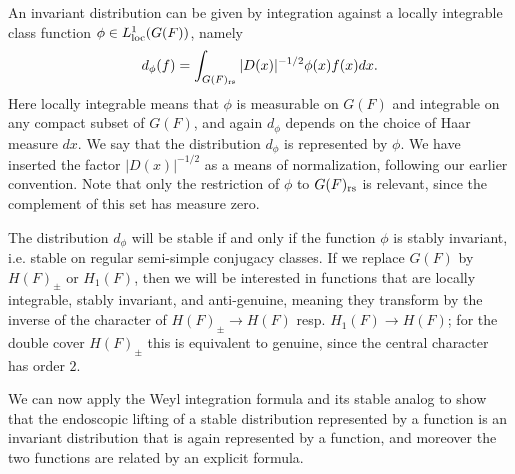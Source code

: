 \documentclass{article}
\theoremstyle{definition}
\numberwithin{equation}{section}
\renewcommand{\-}{\hyp{}}
\begin{document}
An invariant distribution can be given by integration against a locally integrable class function $\phi \in L^1_{\textrm{loc}}(G(F))$, namely 
\[ d_\phi(f) = \int_{G(F)_{\textrm{rs}}} |D(x)|^{-1/2}\phi(x)f(x)dx. \]
Here locally integrable means that $\phi$ is measurable on $G(F)$ and integrable on any compact subset of $G(F)$, and again $d_\phi$ depends on the choice of Haar measure $dx$. We say that the distribution $d_\phi$ is represented by $\phi$. We have inserted the factor $|D(x)|^{-1/2}$ as a means of normalization, following our earlier convention. Note that only the restriction of $\phi$ to $G(F)_{\textrm{rs}}$ is relevant, since the complement of this set has measure zero.

The distribution $d_\phi$ will be stable if and only if the function $\phi$ is stably invariant, i.e. stable on regular semi-simple conjugacy classes. If we replace $G(F)$ by $H(F)_\pm$ or $H_1(F)$, then we will be interested in functions that are locally integrable, stably invariant, and anti-genuine, meaning they transform by the inverse of the  character of $H(F)_\pm \to H(F)$ resp. $H_1(F) \to H(F)$; for the double cover $H(F)_\pm$ this is equivalent to genuine, since the central character has order $2$.

We can now apply the Weyl integration formula and its stable analog to show that the endoscopic lifting of a stable distribution represented by a function is an invariant distribution that is again represented by a function, and moreover the two functions are related by an explicit formula.
\end{document}
